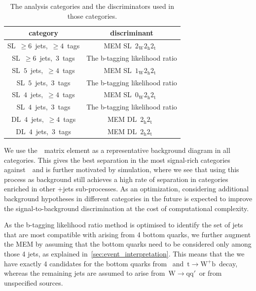\begin{table}[h!]
\begin{center}
\caption[The analysis categories for the~\ttHbb\xspace analysis.]{The analysis categories and the discriminators used in those categories.}
\label{tab:cat_discriminant}
\begin{tabular}{c|c}
\hline
category & discriminant \\
\hline
SL~$\geq6$~jets,~$\geq4$~tags & MEM SL~$2_{\mathrm{W}} 2_{\mathrm{h}} 2_{\mathrm{t}}$~\\
SL~$\geq6$~jets,~$3$~tags & The b-tagging likelihood ratio \\
\hline
SL~$5$~jets,~$\geq4$~tags & MEM SL~$1_{\mathrm{W}} 2_{\mathrm{h}} 2_{\mathrm{t}}$~\\
SL~$5$~jets,~$3$~tags & The b-tagging likelihood ratio \\
\hline
SL~$4$~jets,~$\geq4$~tags & MEM SL~$0_{\mathrm{W}} 2_{\mathrm{h}} 2_{\mathrm{t}}$~\\
SL~$4$~jets,~$3$~tags & The b-tagging likelihood ratio \\
\hline
DL~$4$~jets,~$\ge4$~tags & MEM DL~$2_{\mathrm{h}} 2_{\mathrm{t}}$~\\
DL~$4$~jets,~$3$~tags & MEM DL~$2_{\mathrm{h}} 2_{\mathrm{t}}$~\\
\hline
\hline
\end{tabular}
\end{center}
\end{table}

We use the~\ttbb~matrix element as a representative background diagram in all categories. This gives the best separation in the most signal-rich categories against~\ttbb~and is further motivated by simulation, where we see that using this process as background still achieves a high rate of separation in categories enriched in other \ttbar+jets sub-processes. As an optimization, considering additional background hypotheses in different categories in the future is expected to improve the signal-to-background discrimination at the cost of computational complexity.

As the b-tagging likelihood ratio method is optimised to identify the set of jets that are most compatible with arising from 4 bottom quarks, we further augment the MEM by assuming that the bottom quarks need to be considered only among those 4 jets, as explained in~\cref{sec:event_interpretation}. This means that the we have exactly 4 candidates for the bottom quarks from \Hbb~and~$\mathrm{t} \rightarrow \mathrm{W}^+ \mathrm{b}$~decay, whereas the remaining jets are assumed to arise from~$\mathrm{W} \rightarrow \mathrm{q} \mathrm{q}'$~or from unspecified sources. 

